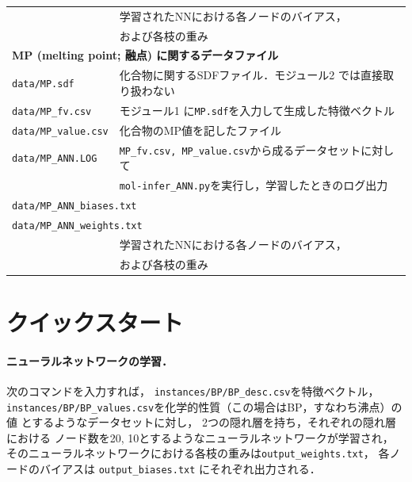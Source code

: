 \documentclass[11pt,titlepage,dvipdfmx,twoside]{jsbook}
\begin{document}
{\begin{table}[t!]
\begin{tabular}{lcll}
  &&\multicolumn{2}{l}{学習されたNNにおける各ノードのバイアス，}\\
  &&\multicolumn{2}{l}{および各枝の重み}\\
  \hline
  \multicolumn{4}{l}{\bf MP (melting point; 融点) に関するデータファイル~\cite{pubchem}}\\
  \multicolumn{2}{l}{\tt data/MP.sdf} & \multicolumn{2}{l}{化合物に関するSDFファイル．モジュール2 では直接取り扱わない}\\
  \multicolumn{2}{l}{\tt data/MP\_fv.csv} & \multicolumn{2}{l}{モジュール1 に{\tt MP.sdf}を入力して生成した特徴ベクトル}\\
  \multicolumn{2}{l}{\tt data/MP\_value.csv} & \multicolumn{2}{l}{化合物のMP値を記したファイル}\\
  \multicolumn{2}{l}{\tt data/MP\_ANN.LOG} & \multicolumn{2}{l}{{\tt MP\_fv.csv, MP\_value.csv}から成るデータセットに対して}\\
  &&\multicolumn{2}{l}{{\tt mol-infer\_ANN.py}を実行し，学習したときのログ出力}\\
  \multicolumn{4}{l}{\tt data/MP\_ANN\_biases.txt} \\
  \multicolumn{4}{l}{\tt data/MP\_ANN\_weights.txt} \\
  &&\multicolumn{2}{l}{学習されたNNにおける各ノードのバイアス，}\\
  &&\multicolumn{2}{l}{および各枝の重み}\\
  \hline
  \end{tabular}

\end{table}
}

\section{クイックスタート}
\label{chap:2quick}

\paragraph{ニューラルネットワークの学習．}

次のコマンドを入力すれば，
\verb|instances/BP/BP_desc.csv|を特徴ベクトル，
\verb|instances/BP/BP_values.csv|を化学的性質（この場合はBP，すなわち沸点）の値
とするようなデータセットに対し，
2つの隠れ層を持ち，それぞれの隠れ層における
ノード数を20, 10とするようなニューラルネットワークが学習され，
そのニューラルネットワークにおける各枝の重みは\verb|output_weights.txt|，
各ノードのバイアスは
\verb|output_biases.txt|
にそれぞれ出力される．
\end{document}
